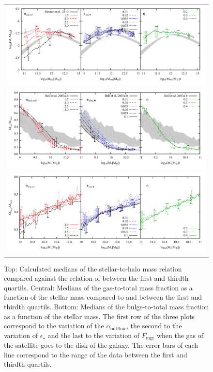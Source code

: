\documentclass[usenatbib]{mn2e}
\begin{document}
\begin{figure}
\centering
\begin{tabular}{c}
\includegraphics{figures/runs/run-v1-13-multiplot-star-frac.pdf} \\
\includegraphics{figures/runs/run-v1-13-multiplot-gas-gfracscatter-quartils.pdf}\\
\includegraphics{figures/runs/run-v1-13-multiplot-bulge.pdf}
\end{tabular}
\caption{Top: Calculated medians of the stellar-to-halo mass relation compared against the relation of \citet{2010ApJ...710..903M} between the first and thirdth quartils. 
Central: Medians of the gas-to-total mass fraction as a  function of the stellar mass compared to \citet{2003ApJS..149..289B} and \citet{2003ApJ...585L.117B} between the 
first and thirdth quartils. Bottom: Medians of the  bulge-to-total mass fraction as a function of the stellar mass. The first
 row of the three plots correspond to the variation of the $\alpha_{\text{outflow}}$, the second to the variation  of $\epsilon_{\star}$ and the last to the 
variation of $F_{\text{mgr}}$ when the gas of the satellite goes to the disk of the galaxy. The error bars of each line correspond to the range of the data between the first and thirdth
quartils. 
\label{fig:properties-runs-compare}}
\end{figure}
\end{document}
